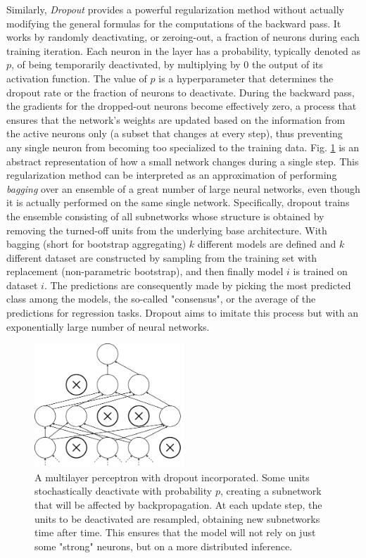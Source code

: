\documentclass[binding=0.7cm, oneside]{sapthesis}
\begin{document}
Similarly, \emph{Dropout} \cite{dropoput} provides a powerful regularization method without actually modifying the general formulas for the computations of the backward pass.
It works by randomly deactivating, or zeroing-out, a fraction of neurons during each training iteration. Each neuron in the layer has a probability, typically denoted as $p$,
of being temporarily deactivated, by multiplying by 0 the output of its activation function. The value of $p$ is a hyperparameter that determines the dropout rate or the fraction
of neurons to deactivate. During the backward pass, the gradients for the dropped-out neurons become effectively zero, a process that ensures that the network's weights are updated
based on the information from the active neurons only (a subset that changes at every step), thus preventing any single neuron from becoming too specialized to the training data.
Fig. \ref{fig:dropout} is an abstract representation of how a small network changes during a single step.
This regularization method can be interpreted as an approximation of performing \emph{bagging} over an ensemble of a great number of large neural networks, even though it is actually performed
on the same single network. Specifically, dropout trains the ensemble consisting of all subnetworks whose structure is obtained by removing the turned-off units from the underlying base architecture.
With bagging (short for bootstrap aggregating) $k$ different models are defined and $k$ different dataset are constructed by sampling from the training set with replacement (non-parametric bootstrap), and then finally
model $i$ is trained on dataset $i$. The predictions are consequently made by picking the most predicted class among the models, the so-called "consensus", or the average of the predictions for regression tasks.
Dropout aims to imitate this process but with an exponentially large number of neural networks.
\begin{figure}[h]
    \centering
    \includegraphics[width=0.5\textwidth]{images/dropout.png}
    \caption{A multilayer perceptron with dropout incorporated. Some units stochastically deactivate with probability $p$, creating a subnetwork that will be affected by backpropagation.
        At each update step, the units to be deactivated are resampled, obtaining new subnetworks time after time. This ensures that the model will not rely on just some "strong" neurons, but on a more
        distributed inference.}
    \label{fig:dropout}
\end{figure}
\end{document}
